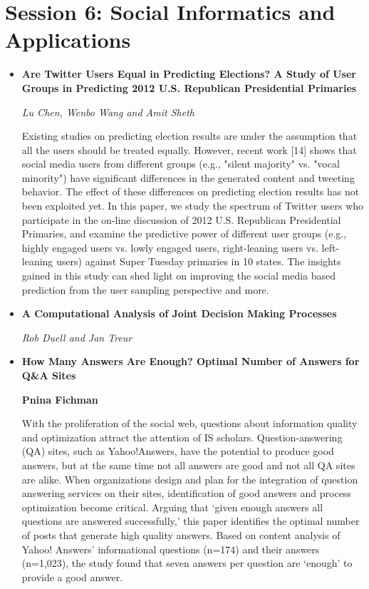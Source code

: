 \section{Session 6: Social Informatics and Applications}
\begin{itemize}

\item \textbf{Are Twitter Users Equal in Predicting Elections? A Study of User
Groups in Predicting 2012 U.S. Republican Presidential Primaries}

\textit{Lu Chen, Wenbo Wang and Amit Sheth}

Existing studies on predicting election results are under the assumption that
all the users should be treated equally. However, recent work [14] shows that
social media users from different groups (e.g., "silent majority" vs. "vocal
minority") have significant differences in the generated content and tweeting
behavior. The effect of these differences on predicting election results has not
been exploited yet. In this paper, we study the spectrum of Twitter users who
participate in the on-line discussion of 2012 U.S. Republican Presidential
Primaries, and examine the predictive power of different user groups (e.g.,
highly engaged users vs. lowly engaged users, right-leaning users vs.
left-leaning users) against Super Tuesday primaries in 10 states. The insights
gained in this study can shed light on improving the social media based
prediction from the user sampling perspective and more.

\item \textbf{A Computational Analysis of Joint Decision Making Processes}

\textit{Rob Duell and Jan Treur}

\item \textbf{How Many Answers Are Enough? Optimal Number of Answers for Q\&A
Sites}

\textbf{Pnina Fichman}

With the proliferation of the social web, questions about information quality
and optimization attract the attention of IS scholars. Question-answering (QA)
sites, such as Yahoo!Answers, have the potential to produce good answers, but at
the same time not all answers are good and not all QA sites are alike. When
organizations design and plan for the integration of question answering services
on their sites, identification of good answers and process optimization become
critical. Arguing that ‘given enough answers all questions are answered
successfully,’ this paper identifies the optimal number of posts that generate
high quality answers. Based on content analysis of Yahoo! Answers’ informational
questions (n=174) and their answers (n=1,023), the study found that seven
answers per question are ‘enough’ to provide a good answer. 


\end{itemize}
